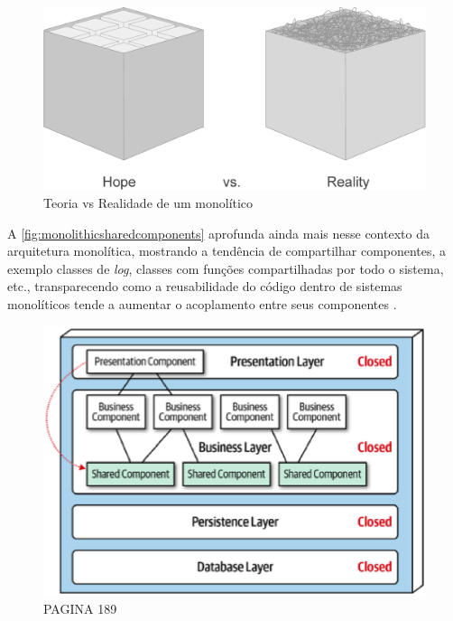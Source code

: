 \begin{figure}[h]
  \centering
  \includegraphics[keepaspectratio=true,scale=0.4]{figuras/monolith-theory-practice.eps}
  \caption{Teoria vs Realidade de um monolítico\label{fig:monolithicInPractice} }
\end{figure}

A \autoref{fig:monolithicsharedcomponents} aprofunda ainda mais nesse contexto da arquitetura
monolítica, mostrando a tendência de compartilhar componentes, a exemplo classes de \textit{log},
classes com funções compartilhadas por todo o sistema, etc., transparecendo como a reusabilidade do
código dentro de sistemas monolíticos tende a aumentar o acoplamento entre seus componentes
\cite{Richards2020:FundamentalsOfSoftwareArchitecture}.

\begin{figure}[h]
  \centering
  \includegraphics[keepaspectratio=true,scale=0.4]{figuras/mono-shared-components.eps}
    \caption{PAGINA 189\label{fig:monolithicsharedcomponents} }
\end{figure}

